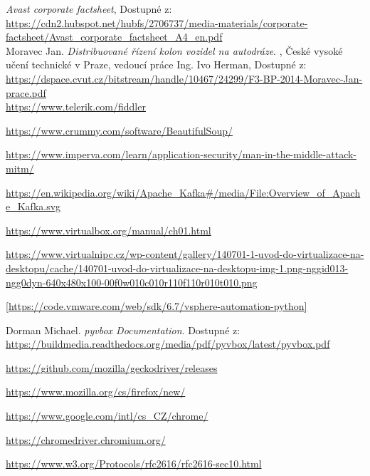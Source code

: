 \documentclass[thesis=M,czech,hidelinks]{FITthesis}[2013/05/06]
\begin{document}


\begin{thebibliography}{9}

    \textit{Avast corporate factsheet}, Dostupné z: \\       \url{https://cdn2.hubspot.net/hubfs/2706737/media-materials/corporate-factsheet/Avast_corporate_factsheet_A4_en.pdf} \\
       	
       	Moravec Jan. \textit{Distribuované řízení kolon vozidel na autodráze}. , České vysoké učení technické v Praze, vedoucí práce Ing. Ivo Herman, Dostupné z: \\    \url{https://dspace.cvut.cz/bitstream/handle/10467/24299/F3-BP-2014-Moravec-Jan-prace.pdf} \\
    
    \url{https://www.telerik.com/fiddler}
    
    \url{https://www.crummy.com/software/BeautifulSoup/} 	

    
    \url{https://www.imperva.com/learn/application-security/man-in-the-middle-attack-mitm/}


	\url{https://en.wikipedia.org/wiki/Apache_Kafka#/media/File:Overview_of_Apache_Kafka.svg}
	
	\url{https://www.virtualbox.org/manual/ch01.html}
	
	\url{https://www.virtualnipc.cz/wp-content/gallery/140701-1-uvod-do-virtualizace-na-desktopu/cache/140701-uvod-do-virtualizace-na-desktopu-img-1.png-nggid013-ngg0dyn-640x480x100-00f0w010c010r110f110r010t010.png}
	
	\url{[https://code.vmware.com/web/sdk/6.7/vsphere-automation-python]}
	
	Dorman Michael. \textit{pyvbox Documentation}.  Dostupné z: \\
	\url{https://buildmedia.readthedocs.org/media/pdf/pyvbox/latest/pyvbox.pdf}
	
	\url{https://github.com/mozilla/geckodriver/releases}
	
	\url{https://www.mozilla.org/cs/firefox/new/}
	
	\url{https://www.google.com/intl/cs_CZ/chrome/}
	
	\url{https://chromedriver.chromium.org/}
	
	\url{https://www.w3.org/Protocols/rfc2616/rfc2616-sec10.html}
	
\end{thebibliography}
\end{document}
